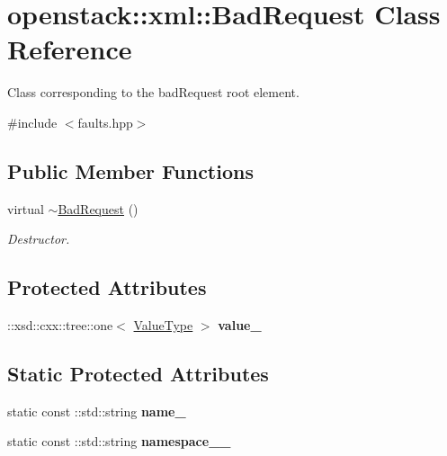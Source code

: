 \hypertarget{classopenstack_1_1xml_1_1BadRequest}{
\section{openstack::xml::BadRequest Class Reference}
\label{classopenstack_1_1xml_1_1BadRequest}
}


Class corresponding to the badRequest root element.  




{\ttfamily \#include $<$faults.hpp$>$}

\subsection*{Public Member Functions}
\begin{DoxyCompactItemize}
\item 
\hypertarget{classopenstack_1_1xml_1_1BadRequest_ab057f8ad8a9469516c3a83a01b617ad1}{
virtual \hyperlink{classopenstack_1_1xml_1_1BadRequest_ab057f8ad8a9469516c3a83a01b617ad1}{$\sim$BadRequest} ()}
\label{classopenstack_1_1xml_1_1BadRequest_ab057f8ad8a9469516c3a83a01b617ad1}

\begin{DoxyCompactList}\small\item\em Destructor. \item\end{DoxyCompactList}\end{DoxyCompactItemize}
\subsection*{Protected Attributes}
\begin{DoxyCompactItemize}
\item 
\hypertarget{classopenstack_1_1xml_1_1BadRequest_a12783265686e25d21147f3efa0c6fbd8}{
::xsd::cxx::tree::one$<$ \hyperlink{classopenstack_1_1xml_1_1BadRequestAPIFault}{ValueType} $>$ {\bfseries value\_\-}}
\label{classopenstack_1_1xml_1_1BadRequest_a12783265686e25d21147f3efa0c6fbd8}

\end{DoxyCompactItemize}
\subsection*{Static Protected Attributes}
\begin{DoxyCompactItemize}
\item 
\hypertarget{classopenstack_1_1xml_1_1BadRequest_ac0468333b12f1a8e8df9fb9391831825}{
static const ::std::string {\bfseries name\_\-}}
\label{classopenstack_1_1xml_1_1BadRequest_ac0468333b12f1a8e8df9fb9391831825}

\item 
\hypertarget{classopenstack_1_1xml_1_1BadRequest_a13bb4f0f0843135467813d5c8d02db32}{
static const ::std::string {\bfseries namespace\_\-\_\-}}
\label{classopenstack_1_1xml_1_1BadRequest_a13bb4f0f0843135467813d5c8d02db32}

\end{DoxyCompactItemize}
